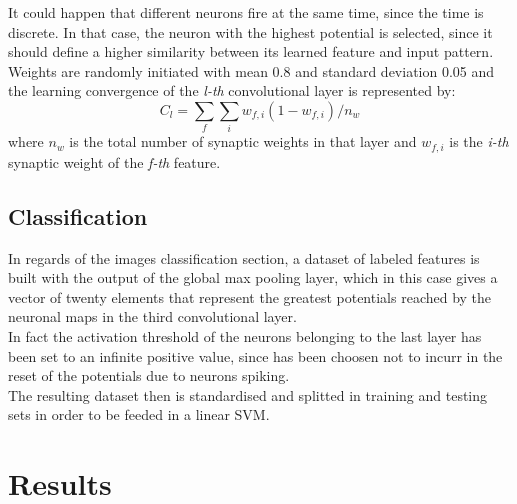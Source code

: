 \documentclass[11pt,a4paper]{scrartcl}
\begin{document}
It could happen that different neurons fire at the same time, since the time is discrete. In that case, the neuron with the highest potential is selected, since it should define a higher similarity between its learned feature and input pattern.\\
Weights are randomly initiated with mean 0.8 and standard deviation 0.05 and the learning convergence of the \textit{l-th} convolutional layer is represented by:
\begin{equation*}
C_{l} = \sum_{f}\sum_{i}w_{f,i}(1-w_{f,i})/n_{w}
\end{equation*}
where $ n_{w} $ is the total number of synaptic weights in that layer and $ w_{f,i} $ is the \textit{i-th} synaptic weight of the \textit{f-th} feature.

\subsection{Classification}
In regards of the images classification section, a dataset of labeled features is built with the output of the global max pooling layer, which in this case gives a vector of twenty elements that represent the greatest potentials reached by the neuronal maps in the third convolutional layer.\\
In fact the activation threshold of the neurons belonging to the last layer has been set to an infinite positive value, since has been choosen not to incurr in the reset of the potentials due to neurons spiking.\\
The resulting dataset then is standardised and splitted in training and testing sets in order to be feeded in a linear SVM.



\section{Results}
\end{document}
